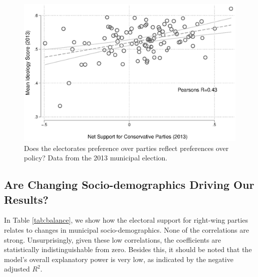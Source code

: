 \documentclass[a4paper,12pt]{article}
\begin{document}
\begin{figure}[htbp]
	\includegraphics[width=1\textwidth]{validation1.eps}
	\caption{Does the electorates preference over parties reflect preferences over policy? Data from the 2013 municipal election.} \label{validation1}
\end{figure}  
\clearpage


\subsection{Are Changing Socio-demographics Driving Our Results?}\label{balance}

\setcounter{table}{0}
\setcounter{figure}{0}

In Table \ref{tab:balance}, we show how the electoral support for right-wing parties relates to changes in municipal socio-demographics. None of the correlations are strong. Unsurprisingly, given these low correlations, the coefficients are statistically indistinguishable from zero. Besides this, it should be noted that the model's overall explanatory power is very low, as indicated by the negative adjusted $R^2$.
\end{document}
